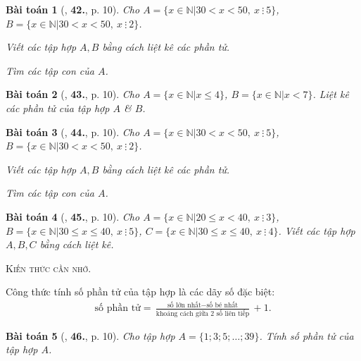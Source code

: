 \documentclass{article}
\numberwithin{equation}{section}
\newtheorem{baitoan}{Bài toán}[section]
\begin{document}
\begin{baitoan}[\cite{Trong_Toan_6_2021}, \textbf{42.}, p. 10]
	Cho $A = \{x\in\mathbb{N}|30 < x < 50,\ x\ \vdots\ 5\}$, $B = \{x\in\mathbb{N}|30 < x < 50,\ x\ \vdots\ 2\}$.
	\begin{enumerate*}
		\item Viết các tập hợp $A,B$ bằng cách liệt kê các phần tử.
		\item Tìm các tập con của $A$.
	\end{enumerate*}
\end{baitoan}

\begin{baitoan}[\cite{Trong_Toan_6_2021}, \textbf{43.}, p. 10]
	Cho $A = \{x\in\mathbb{N}|x\le 4\}$, $B = \{x\in\mathbb{N}|x < 7\}$. Liệt kê các phần tử của tập hợp $A$ \& $B$.
\end{baitoan}

\begin{baitoan}[\cite{Trong_Toan_6_2021}, \textbf{44.}, p. 10]
	Cho $A = \{x\in\mathbb{N}|30 < x < 50,\ x\ \vdots\ 5\}$, $B = \{x\in\mathbb{N}|30 < x < 50,\ x\ \vdots\ 2\}$.	
	\begin{enumerate*}
		\item Viết các tập hợp $A,B$ bằng cách liệt kê các phần tử.
		\item Tìm các tập con của $A$.
	\end{enumerate*}
\end{baitoan}

\begin{baitoan}[\cite{Trong_Toan_6_2021}, \textbf{45.}, p. 10]
	Cho $A = \{x\in\mathbb{N}|20\le x < 40,\ x\ \vdots\ 3\}$, $B = \{x\in\mathbb{N}|30\le x\le 40,\ x\ \vdots\ 5\}$, $C = \{x\in\mathbb{N}|30\le x\le 40,\ x\ \vdots\ 4\}$. Viết các tập hợp $A,B,C$ bằng cách liệt kê.
\end{baitoan}
\noindent\textsc{Kiến thức cần nhớ.}
\begin{tcolorbox}
	Công thức tính số phần tử của tập hợp là các dãy số đặc biệt:
	\begin{align*}
		\mbox{số phần tử} = \frac{\mbox{số lớn nhất} - \mbox{số bé nhất}}{\mbox{khoảng cách giữa 2 số liên tiếp}} + 1.
	\end{align*}
\end{tcolorbox}

\begin{baitoan}[\cite{Trong_Toan_6_2021}, \textbf{46.}, p. 10]
	Cho tập hợp $A = \{1;3;5;\ldots;39\}$. Tính số phần tử của tập hợp $A$.
\end{baitoan}
\end{document}
